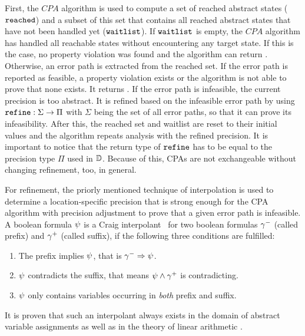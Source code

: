 First, the $CPA$ algorithm is used to compute a set of reached abstract states ($\texttt{reached}$) and a subset of this set that contains all reached abstract states that have not been handled yet ($\texttt{waitlist}$).
If $\texttt{waitlist}$ is empty, the $CPA$ algorithm has handled all reachable states without encountering any target state.
If this is the case, no property violation was found and the algorithm can return \safe.
Otherwise, an error path is extracted from the reached set.
If the error path is reported as feasible, a property violation exists or the algorithm is not able to prove that none exists. It returns \unsafe.
If the error path is infeasible, the current precision is too abstract.
It is refined based on the infeasible error path by using $\texttt{refine} : \Sigma \rightarrow \Pi$ with $\Sigma$ being the set of all error paths, so that it can prove its infeasibility.
After this, the reached set and waitlist are reset to their initial values and the algorithm repeats analysis with the refined precision.
It is important to notice that the return type of $\texttt{refine}$ has to be equal to the precision type $\Pi$ used in $\mathbb{D}$.
Because of this, CPAs are not exchangeable without changing refinement, too, in general.

For refinement, the priorly mentioned technique of interpolation is used to determine a location-specific precision that is strong enough for the CPA algorithm with precision adjustment to prove that a given error path is infeasible.
A boolean formula $\psi$ is a Craig interpolant \cite{Craig1957}\ for two boolean formulas ${\gamma^{-}}$ (called prefix) and ${\gamma^{+}}$ (called suffix), if the following three conditions are fulfilled:
\begin{enumerate}[label=\alph*)]
\item The prefix implies $\psi$, that is ${\gamma^{-}} \Rightarrow \psi$.
\item $\psi$ contradicts the suffix, that means $\psi \wedge {\gamma^{+}}$ is contradicting.
\item $\psi$ only contains variables occurring in \emph{both} prefix and suffix.
\end{enumerate}
It is proven that such an interpolant always exists in the domain of abstract variable assignments \cite{Beyer2013} as well as in the theory of linear arithmetic \cite{Craig1957}.

